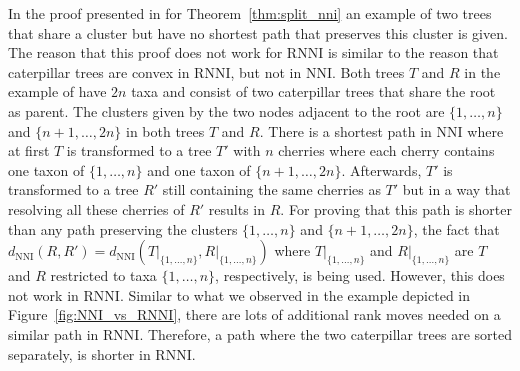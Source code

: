 \documentclass{amsart}
\newcommand{\nni}{\mathrm{NNI}}
\newcommand{\rnni}{\mathrm{RNNI}}
\begin{document}
In the proof presented in \autocite{Li1996-zw} for Theorem~\ref{thm:split_nni} an example of two trees that share a cluster but have no shortest path that preserves this cluster is given.
The reason that this proof does not work for $\rnni$ is similar to the reason that caterpillar trees are convex in $\rnni$, but not in $\nni$.
Both trees $T$ and $R$ in the example of \autocite{Li1996-zw} have $2n$ taxa and consist of two caterpillar trees that share the root as parent.
The clusters given by the two nodes adjacent to the root are $\{1, \ldots, n\}$ and $\{n+1, \ldots, 2n\}$ in both trees $T$ and $R$.
There is a shortest path in $\nni$ where at first $T$ is transformed to a tree $T'$ with $n$ cherries where each cherry contains one taxon of $\{1, \ldots, n\}$ and one taxon of $\{n+1, \ldots, 2n\}$.
Afterwards, $T'$ is transformed to a tree $R'$ still containing the same cherries as $T'$ but in a way that resolving all these cherries of $R'$ results in $R$.
For proving that this path is shorter than any path preserving the clusters $\{1, \ldots, n\}$ and $\{n+1, \ldots, 2n\}$, the fact that $d_{\nni}(R,R') = d_{\nni}(T{\big|}_{\{1, \ldots, n\}}, R{\big|}_{\{1, \ldots, n\}})$ where $T{\big|}_{\{1, \ldots, n\}}$ and $R{\big|}_{\{1, \ldots, n\}}$ are $T$ and $R$ restricted to taxa $\{1,\ldots,n\}$, respectively, is being used.
However, this does not work in $\rnni$.
Similar to what we observed in the example depicted in Figure~\ref{fig:NNI_vs_RNNI}, there are lots of additional rank moves needed on a similar path in $\rnni$.
Therefore, a path where the two caterpillar trees are sorted separately, is shorter in $\rnni$.
\end{document}
